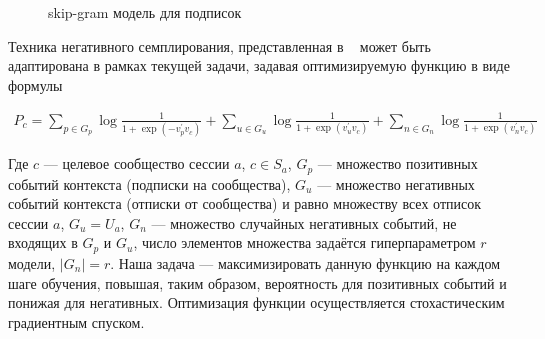 \documentclass[times,specification,annotation]{itmo-student-thesis}
\begin{document}
\begin{figure}[!h]
\caption{skip-gram модель для подписок}\label{fig2}
\centering
{}
\end{figure}

Техника негативного семплирования, представленная в ~\cite{airbnb} может быть адаптирована в рамках текущей задачи, задавая оптимизируемую функцию в виде формулы

\begin{align}
P_c = \sum_{p \in G_p} \log \frac{1}{1 + \exp(-v_p^{'}v_c)} + \sum_{u \in G_u} \log \frac{1}{1 + \exp(v_u^{'}v_c)} + \sum_{n \in G_n} \log \frac{1}{1 + \exp(v_n^{'}v_c)} \label{eq3}
\end{align}

Где $c$ --- целевое сообщество сессии $a$, $c \in S_a$, $G_p$ --- множество позитивных событий
контекста (подписки на сообщества), $G_u$ --- множество негативных событий
контекста (отписки от сообщества) и равно множеству всех отписок сессии $a$, $G_u = U_a$, $G_n$ --- множество случайных негативных событий, не входящих в $G_p$ и $G_u$, число элементов множества задаётся гиперпараметром $r$ модели, $|G_n| = r$. Наша задача --- максимизировать данную
функцию на каждом шаге обучения, повышая, таким образом, вероятность для
позитивных событий и понижая для негативных. Оптимизация функции осуществляется стохастическим градиентным спуском. 
\end{document}
